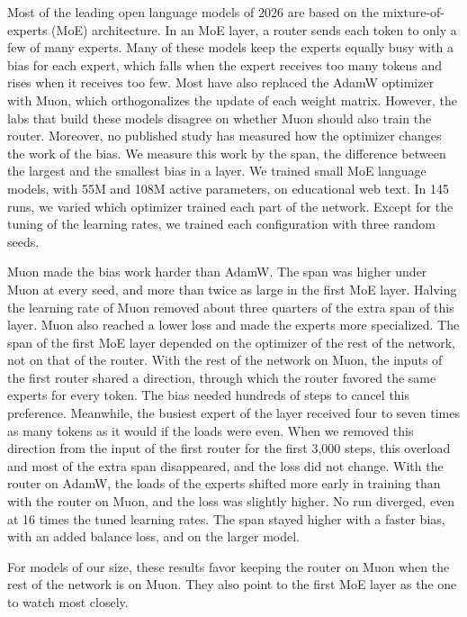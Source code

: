 
Most of the leading open language models of 2026 are based on the mixture-of-experts (MoE) architecture. In an MoE layer, a router sends each token to only a few of many experts. Many of these models keep the experts equally busy with a bias for each expert, which falls when the expert receives too many tokens and rises when it receives too few. Most have also replaced the AdamW optimizer with Muon, which orthogonalizes the update of each weight matrix. However, the labs that build these models disagree on whether Muon should also train the router. Moreover, no published study has measured how the optimizer changes the work of the bias. We measure this work by the span, the difference between the largest and the smallest bias in a layer. We trained small MoE language models, with 55M and 108M active parameters, on educational web text. In 145 runs, we varied which optimizer trained each part of the network. Except for the tuning of the learning rates, we trained each configuration with three random seeds.

Muon made the bias work harder than AdamW\@. The span was higher under Muon at every seed, and more than twice as large in the first MoE layer. Halving the learning rate of Muon removed about three quarters of the extra span of this layer. Muon also reached a lower loss and made the experts more specialized. The span of the first MoE layer depended on the optimizer of the rest of the network, not on that of the router. With the rest of the network on Muon, the inputs of the first router shared a direction, through which the router favored the same experts for every token. The bias needed hundreds of steps to cancel this preference. Meanwhile, the busiest expert of the layer received four to seven times as many tokens as it would if the loads were even. When we removed this direction from the input of the first router for the first 3,000 steps, this overload and most of the extra span disappeared, and the loss did not change. With the router on AdamW, the loads of the experts shifted more early in training than with the router on Muon, and the loss was slightly higher. No run diverged, even at 16 times the tuned learning rates. The span stayed higher with a faster bias, with an added balance loss, and on the larger model.

For models of our size, these results favor keeping the router on Muon when the rest of the network is on Muon. They also point to the first MoE layer as the one to watch most closely.

